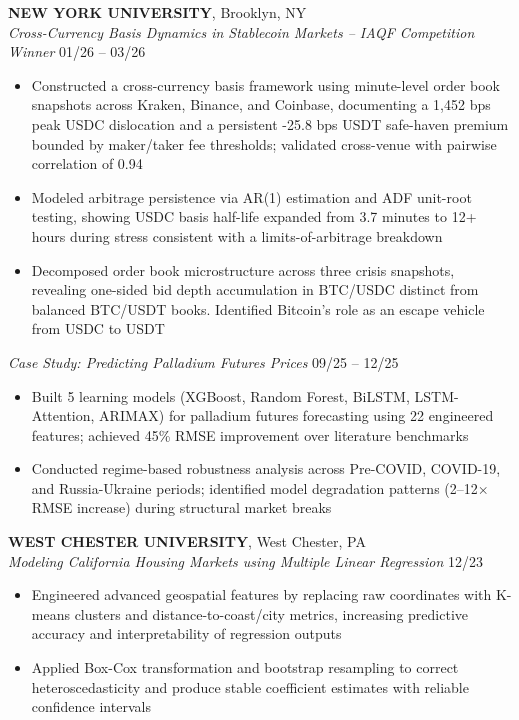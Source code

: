 \documentclass[10pt, letterpaper]{article}
\begin{document}
\textbf{NEW YORK UNIVERSITY}, Brooklyn, NY \\[1pt]
\textit{Cross-Currency Basis Dynamics in Stablecoin Markets -- IAQF Competition Winner} \hfill 01/26 -- 03/26
\begin{itemize}
  \item Constructed a cross-currency basis framework using minute-level order book snapshots across Kraken, Binance, and Coinbase, documenting a 1,452 bps peak USDC dislocation and a persistent -25.8 bps USDT safe-haven premium bounded by maker/taker fee thresholds; validated cross-venue with pairwise correlation of 0.94
  \item Modeled arbitrage persistence via AR(1) estimation and ADF unit-root testing, showing USDC basis half-life expanded from 3.7 minutes to 12+ hours during stress consistent with a limits-of-arbitrage breakdown 
  \item Decomposed order book microstructure across three crisis snapshots, revealing one-sided bid depth accumulation in BTC/USDC distinct from balanced BTC/USDT books. Identified Bitcoin's role as an escape vehicle from USDC to USDT 
\end{itemize}

\textit{Case Study: Predicting Palladium Futures Prices} \hfill 09/25 -- 12/25
\begin{itemize}
  \item Built 5 learning models (XGBoost, Random Forest, BiLSTM, LSTM-Attention, ARIMAX) for palladium futures forecasting using 22 engineered features; achieved 45\% RMSE improvement over literature benchmarks
  \item Conducted regime-based robustness analysis across Pre-COVID, COVID-19, and Russia-Ukraine periods; identified model degradation patterns (2--12$\times$ RMSE increase) during structural market breaks
\end{itemize}



\vspace{3pt}

\textbf{WEST CHESTER UNIVERSITY}, West Chester, PA \\[1pt]
\textit{Modeling California Housing Markets using Multiple Linear Regression} \hfill 12/23
\begin{itemize}
  \item Engineered advanced geospatial features by replacing raw coordinates with K-means clusters and distance-to-coast/city metrics, increasing predictive accuracy and interpretability of regression outputs
  \item Applied Box-Cox transformation and bootstrap resampling to correct heteroscedasticity and produce stable coefficient estimates with reliable confidence intervals
\end{itemize}
\end{document}
